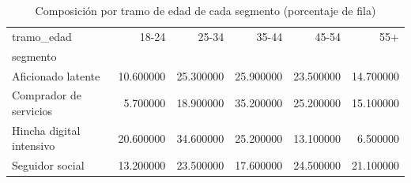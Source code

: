 \begin{table}
\caption{Composición por tramo de edad de cada segmento (porcentaje de fila)}
\label{tab:segmentos_edad}
\begin{tabular}{lrrrrr}
\toprule
tramo\_edad & 18-24 & 25-34 & 35-44 & 45-54 & 55+ \\
segmento &  &  &  &  &  \\
\midrule
Aficionado latente & 10.600000 & 25.300000 & 25.900000 & 23.500000 & 14.700000 \\
Comprador de servicios & 5.700000 & 18.900000 & 35.200000 & 25.200000 & 15.100000 \\
Hincha digital intensivo & 20.600000 & 34.600000 & 25.200000 & 13.100000 & 6.500000 \\
Seguidor social & 13.200000 & 23.500000 & 17.600000 & 24.500000 & 21.100000 \\
\bottomrule
\end{tabular}
\end{table}
